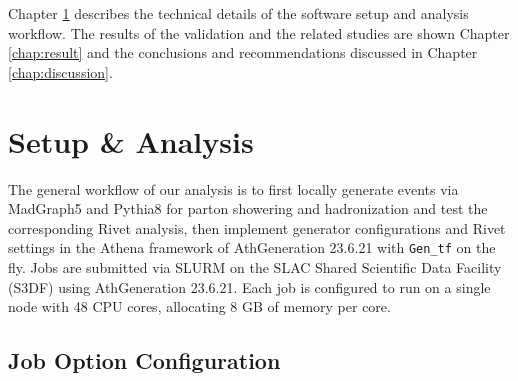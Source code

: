 \documentclass[NOTE, REPORT=true, atlasdraft=true, USenglish]{atlasdoc}
\begin{document}
Chapter \ref{chap:analysis} describes the technical details of the software setup and analysis workflow. The results of the validation and the related studies are shown Chapter \ref{chap:result} and the conclusions and recommendations discussed in Chapter \ref{chap:discussion}.




\chapter{Setup \& Analysis}
\label{chap:analysis}


The general workflow of our analysis is to first locally generate events via MadGraph5 and Pythia8 for parton showering and hadronization and test the corresponding Rivet analysis\cite{buckley_rivet_2013}, then implement generator configurations and Rivet settings in the Athena framework of AthGeneration 23.6.21 with \texttt{Gen\_tf} on the fly. Jobs are submitted via SLURM on the SLAC Shared Scientific Data Facility (S3DF) using AthGeneration 23.6.21. Each job is configured to run on a single node with 48 CPU cores, allocating 8 GB of memory per core.

\section{Job Option Configuration}
\label{sec:JO configuration}
\end{document}
